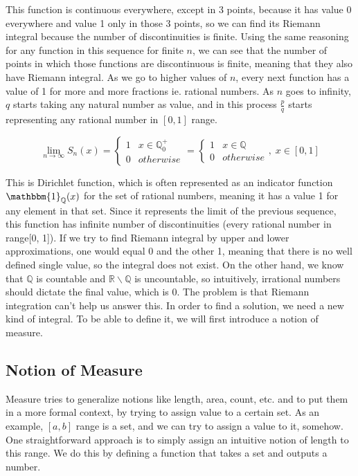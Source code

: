 \documentclass{article}
\begin{document}
This function is continuous everywhere, except in 3 points, because it has value 0 everywhere and value 1 only in those 3 points, so we can find its Riemann integral because the number of discontinuities is finite. Using the same reasoning for any function in this sequence for finite $n$, we can see that the number of points in which those functions are discontinuous is finite, meaning that they also have Riemann integral. As we go to higher values of $n$, every next function has a value of 1 for more and more fractions ie. rational numbers. As $n$ goes to infinity, $q$ starts taking any natural number as value, and in this process $\frac{p}{q}$ starts representing any rational number in $[0, 1]$ range.

\[ \lim_{n\to\infty}S_n(x) = \begin{cases}
    1 & x \in \mathbb{Q}_{0}^{+} \\
    0 & otherwise
\end{cases} = \begin{cases}
    1 & x \in \mathbb{Q} \\
    0 & otherwise
\end{cases},\; x \in [0, 1] \]

This is Dirichlet function, which is often represented as an indicator function $\mathbbm{1}_{\mathbb{Q}}(x)$ for the set of rational numbers, meaning it has a value 1 for any element in that set. Since it represents the limit of the previous sequence, this function has infinite number of discontinuities (every rational number in range[0, 1]). If we try to find Riemann integral by upper and lower approximations, one would equal 0 and the other 1, meaning that there is no well defined single value, so the integral does not exist. On the other hand, we know that $\mathbb{Q}$ is countable and $\mathbb{R}\backslash\mathbb{Q}$ is uncountable, so intuitively, irrational numbers should dictate the final value, which is 0. The problem is that Riemann integration can't help us answer this. In order to find a solution, we need a new kind of integral. To be able to define it, we will first introduce a notion of measure.

\subsection{Notion of Measure}
Measure tries to generalize notions like length, area, count, etc. and to put them in a more formal context, by trying to assign value to a certain set. As an example, $[a, b]$ range is a set, and we can try to assign a value to it, somehow. One straightforward approach is to simply assign an intuitive notion of length to this range. We do this by defining a function that takes a set and outputs a number.
\end{document}
